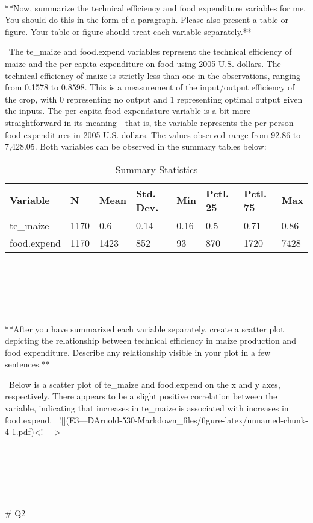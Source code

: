 \documentclass[
]{article}
\begin{document}
\begin{}
\

**Now, summarize the technical efficiency and food expenditure variables for me. You should do this in the form of a paragraph. Please also present a table or figure. Your table or figure should treat each variable separately.**

\
The te_maize and food.expend variables represent the technical efficiency of maize and the per capita expenditure on food using 2005 U.S. dollars. The technical efficiency of maize is strictly less than one in the observations, ranging from 0.1578 to 0.8598. This is a measurement of the input/output efficiency of the crop, with 0 representing no output and 1 representing optimal output given the inputs. The per capita food expendature variable is a bit more straightforward in its meaning - that is, the variable represents the per person food expenditures in 2005 U.S. dollars. The values observed range from 92.86 to 7,428.05. Both variables can be observed in the summary tables below:
\
\begin{table}

\caption{\label{tab:unnamed-chunk-3}Summary Statistics}
\centering
\begin{tabular}[t]{llllllll}
\toprule
Variable & N & Mean & Std. Dev. & Min & Pctl. 25 & Pctl. 75 & Max\\
\midrule
te_maize & 1170 & 0.6 & 0.14 & 0.16 & 0.5 & 0.71 & 0.86\\
food.expend & 1170 & 1423 & 852 & 93 & 870 & 1720 & 7428\\
\bottomrule
\end{tabular}
\end{table}
\

\

\

**After you have summarized each variable separately, create a scatter plot depicting the relationship between technical efficiency in maize production and food expenditure. Describe any relationship visible in your plot in a few sentences.**

\
Below is a scatter plot of te_maize and food.expend on the x and y axes, respectively. There appears to be a slight positive correlation between the variable, indicating that increases in te_maize is associated with increases in food.expend. 
\
![](E3---DArnold-530-Markdown_files/figure-latex/unnamed-chunk-4-1.pdf)<!-- --> 

\

\

\

# Q2


\end{}
\end{document}
